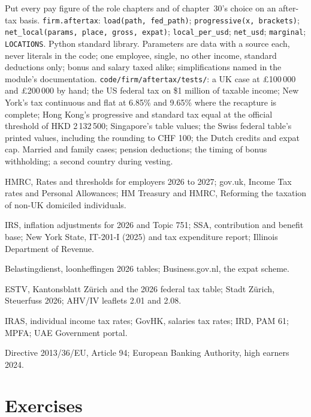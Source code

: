 \begin{build}
 Put every pay figure of the role chapters and of chapter~30's choice on an after-tax basis.
 \texttt{firm.aftertax}: \texttt{load(path, fed\_path)}; \texttt{progressive(x, brackets)};
\texttt{net\_local(params, place, gross, expat)}; \texttt{local\_per\_usd}; \texttt{net\_usd}; \texttt{marginal};
\texttt{LOCATIONS}. Python standard library.
 Parameters are data with a source each, never literals in the code; one employee, single, no other income,
standard deductions only; bonus and salary taxed alike; simplifications named in the module's documentation.
 \texttt{code/firm/aftertax/tests/}: a UK case at \pounds100\,000 and \pounds200\,000 by hand; the
US federal tax on \$1 million of taxable income; New York's tax continuous and flat at 6.85\% and 9.65\% where the recapture
is complete; Hong Kong's progressive and standard tax equal at the official threshold of HKD 2\,132\,500; Singapore's
table values; the Swiss federal table's printed values, including the rounding to CHF 100; the Dutch credits and expat cap.
 Married and family cases; pension deductions; the timing of bonus withholding; a second country during
vesting.
\end{build}

\begin{omsources}
\item HMRC, Rates and thresholds for employers 2026 to 2027; gov.uk, Income Tax rates and Personal Allowances; HM Treasury
and HMRC, Reforming the taxation of non-UK domiciled individuals.
\item IRS, inflation adjustments for 2026 and Topic 751; SSA, contribution and benefit base; New York State, IT-201-I
(2025) and tax expenditure report; Illinois Department of Revenue.
\item Belastingdienst, loonheffingen 2026 tables; Business.gov.nl, the expat scheme.
\item ESTV, Kantonsblatt Zürich and the 2026 federal tax table; Stadt Zürich, Steuerfuss 2026; AHV/IV leaflets 2.01 and
2.08.
\item IRAS, individual income tax rates; GovHK, salaries tax rates; IRD, PAM 61; MPFA; UAE Government portal.
\item Directive 2013/36/EU, Article 94; European Banking Authority, high earners 2024.
\end{omsources}

\section{Exercises}

